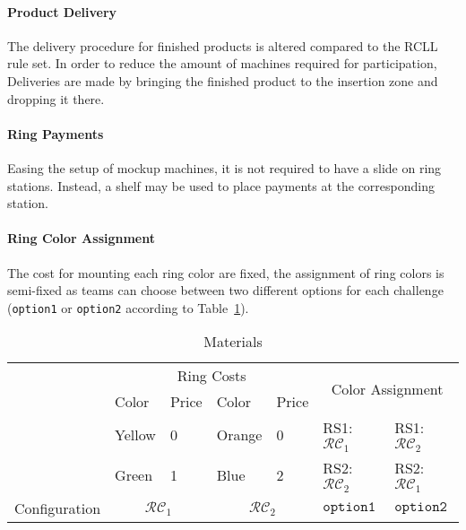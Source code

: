\documentclass[12pt,twoside]{article}
\newcommand{\reftab}[1]{Table~\ref{#1}}
\begin{document}
\paragraph{Product Delivery}
The delivery procedure for finished products is altered compared to the
\ac{RCLL} rule set. In order to reduce the amount of machines required
for participation, Deliveries are made by bringing the finished product
to the insertion zone and dropping it there.

\paragraph{Ring Payments}
Easing the setup of mockup machines, it is not required to have a slide
on ring stations. Instead, a shelf may be used to place payments at the
corresponding station.

\paragraph{Ring Color Assignment}
The cost for mounting each ring color are fixed, the assignment of ring colors
is semi-fixed as teams can choose between two different options for each
challenge (\texttt{option1} or \texttt{option2} according to
\reftab{tab:ring-costs}).

\newcommand{\colconfig}{\mathcal{RC}}
\begin{table}[!htb]
    \centering
        \begin{tabular}{l|l|l||l|l||l|l}
					& \multicolumn{4}{c||}{Ring Costs}
					& \multicolumn{2}{c}{\multirow{2}{*}{Color Assignment }}\\\cline{2-5}
					& Color  & Price & Color  & Price & \multicolumn{2}{c}{}\\\cline{2-7}
					& Yellow & 0 & Orange & 0
					& RS1: $\colconfig_1$ & RS1: $\colconfig_2$ \\
					& Green  & 1 & Blue & 2
					& RS2: $\colconfig_2$ & RS2: $\colconfig_1$ \\\hline\hline
					Configuration & \multicolumn{2}{c||}{$\colconfig_1$}
					& \multicolumn{2}{c||}{$\colconfig_2$}
					& $\texttt{option1}$ & $\texttt{option2}$\\
        \end{tabular}
    \caption{Materials}
    \label{tab:ring-costs}
\end{table}
\end{document}
